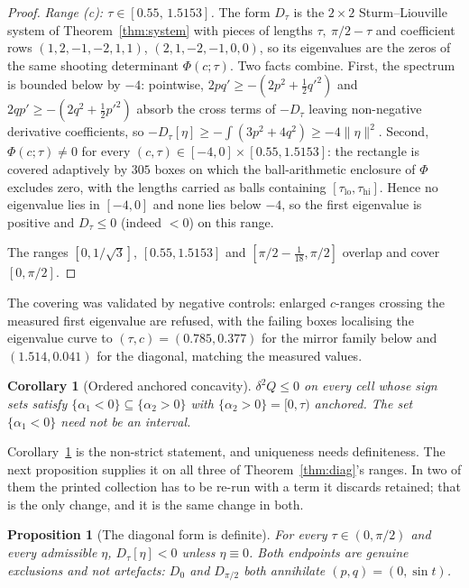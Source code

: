 \documentclass[11pt]{article}
\newtheorem{proposition}[theorem]{Proposition}
\newtheorem{corollary}[theorem]{Corollary}
\theoremstyle{definition}
\begin{document}
\begin{proof}
\emph{Range (c): $\tau\in[0.55,\,1.5153]$.} The form $D_\tau$ is the $2\times2$
Sturm--Liouville system of Theorem~\ref{thm:system} with pieces of lengths
$\tau,\ \pi/2-\tau$ and coefficient rows $(1,2,-1,-2,1,1)$, $(2,1,-2,-1,0,0)$, so its
eigenvalues are the zeros of the same shooting determinant $\Phi(c;\tau)$. Two facts
combine. First, the spectrum is bounded below by $-4$: pointwise,
$2pq'\ge-(2p^2+\tfrac12q'^2)$ and $2qp'\ge-(2q^2+\tfrac12p'^2)$ absorb the cross terms of
$-D_\tau$ leaving non-negative derivative coefficients, so
$-D_\tau[\eta]\ge-\int(3p^2+4q^2)\ge-4\|\eta\|^2$. Second, $\Phi(c;\tau)\ne0$ for every
$(c,\tau)\in[-4,0]\times[0.55,1.5153]$: the rectangle is covered adaptively by $305$
boxes on which the ball-arithmetic enclosure of $\Phi$ excludes zero, with the lengths
carried as balls containing $[\tau_{\mathrm{lo}},\tau_{\mathrm{hi}}]$. Hence no eigenvalue
lies in $[-4,0]$ and none lies below $-4$, so the first eigenvalue is positive and
$D_\tau\le0$ (indeed $<0$) on this range.

The ranges $[0,1/\sqrt3]$, $[0.55,1.5153]$ and $[\pi/2-\tfrac1{18},\pi/2]$ overlap and
cover $[0,\pi/2]$.
\end{proof}

The covering was validated by negative controls: enlarged $c$-ranges crossing the
measured first eigenvalue are refused, with the failing boxes localising the eigenvalue
curve to $(\tau,c)=(0.785,0.377)$ for the mirror family below and $(1.514,0.041)$ for the
diagonal, matching the measured values.

\begin{corollary}[Ordered anchored concavity]\label{cor:anchored}
$\delta^2Q\le0$ on every cell whose sign sets satisfy
$\{\alpha_1<0\}\subseteq\{\alpha_2>0\}$ with $\{\alpha_2>0\}=[0,\tau)$ anchored. The set
$\{\alpha_1<0\}$ need not be an interval.
\end{corollary}

Corollary~\ref{cor:anchored} is the non-strict statement, and uniqueness needs definiteness.
The next proposition supplies it on all three of Theorem~\ref{thm:diag}'s ranges. In two of
them the printed collection has to be re-run with a term it discards retained; that is the
only change, and it is the same change in both.

\begin{proposition}[The diagonal form is definite]\label{prop:dstrict}
For every $\tau\in(0,\pi/2)$ and every admissible $\eta$, $D_\tau[\eta]<0$ unless
$\eta\equiv0$. Both endpoints are genuine exclusions and not artefacts: $D_0$ and
$D_{\pi/2}$ both annihilate $(p,q)=(0,\sin t)$.
\end{proposition}
\end{document}

